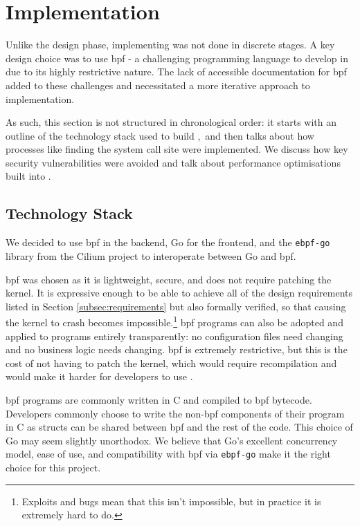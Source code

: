 \section{Implementation}\label{sec:implementation}

Unlike the design phase, implementing \af was not done in discrete
stages. A key design choice was to use \ac{bpf} - a challenging programming language
to develop in due to its highly restrictive nature. The lack of accessible
documentation for \ac{bpf} added to these challenges and necessitated a more
iterative approach to implementation.

As such, this section is not structured in chronological order: it starts with
an outline of the technology stack used to build \afss,~and then talks about how
processes like finding the system call site were implemented. We discuss 
how key security vulnerabilities were avoided and talk about performance 
optimisations built into \af.

\subsection{Technology Stack}\label{subsection:tech-stack}

We decided to use \ac{bpf} in the backend, Go for the frontend, and the
\texttt{ebpf-go} library from the Cilium project to interoperate between Go and
\ac{bpf}.

\ac{bpf} was chosen as it is lightweight, secure, and does not require 
patching the kernel. It is expressive enough to be able to achieve 
all of the design requirements listed in Section \ref{subsec:requirements} 
but also formally verified, so that causing the kernel to crash becomes
impossible.\footnote{Exploits and bugs mean that this isn't impossible, but in
practice it is extremely hard to do.} \ac{bpf} programs can also be adopted and
applied to programs entirely transparently: no configuration files need changing
and no business logic needs changing. \ac{bpf} is extremely restrictive, but
this is the cost of not having to patch the kernel, which would require
recompilation and would make it harder for developers to use \afss.

\ac{bpf} programs are commonly written in C and compiled to \ac{bpf} bytecode.
Developers commonly choose to write the non-\ac{bpf} components of their program
in C as structs can be shared between \ac{bpf} and the rest of the code.
This choice of Go may seem slightly unorthodox. We believe that Go's
excellent concurrency model, ease of use, and compatibility with \ac{bpf} via
\texttt{ebpf-go} make it the right choice for this project. 

